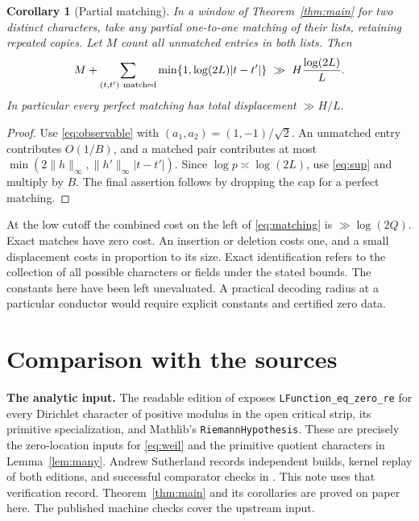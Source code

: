 \documentclass[11pt]{article}
\newtheorem{corollary}[theorem]{Corollary}
\begin{document}
\begin{corollary}[Partial matching]\label{cor:matching}
In a window of Theorem~\ref{thm:main} for two distinct characters, take any partial one-to-one matching of their lists, retaining repeated copies. Let \(M\) count all unmatched entries in both lists. Then
\begin{equation}\label{eq:matching}
 M+\sum_{(t,t')\ {\rm matched}}
 \min\{1,\log(2L)|t-t'|\}\ \gg\ H\frac{\log(2L)}{L}.
\end{equation}
In particular every perfect matching has total displacement \(\gg H/L\).
\end{corollary}
\begin{proof}
Use \eqref{eq:observable} with \((a_1,a_2)=(1,-1)/\sqrt2\). An unmatched entry contributes \(O(1/B)\), and a matched pair contributes at most
\(\min(2\|h\|_\infty,\|h'\|_\infty |t-t'|)\). Since \(\log p\asymp\log(2L)\), use \eqref{eq:sup} and multiply by \(B\). The final assertion follows by dropping the cap for a perfect matching.
\end{proof}

At the low cutoff the combined cost on the left of \eqref{eq:matching} is \(\gg\log(2Q)\). Exact matches have zero cost. An insertion or deletion costs one, and a small displacement costs in proportion to its size. Exact identification refers to the collection of all possible characters or fields under the stated bounds. The constants here have been left unevaluated. A practical decoding radius at a particular conductor would require explicit constants and certified zero data.

\section{Comparison with the sources}
\textbf{The analytic input.} The readable edition of \cite{lean} exposes \texttt{LFunction\_eq\_zero\_re} for every Dirichlet character of positive modulus in the open critical strip, its primitive specialization, and Mathlib's \texttt{RiemannHypothesis}. These are precisely the zero-location inputs for \eqref{eq:weil} and the primitive quotient characters in Lemma~\ref{lem:many}. Andrew Sutherland records independent builds, kernel replay of both editions, and successful comparator checks in \cite{audit}. This note uses that verification record. Theorem~\ref{thm:main} and its corollaries are proved on paper here. The published machine checks cover the upstream input.
\end{document}
